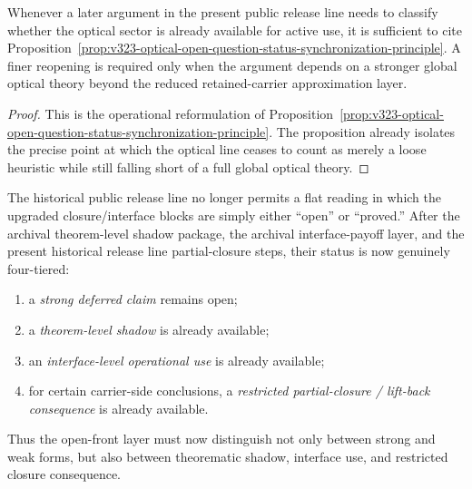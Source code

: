 \begin{corollary}
\label{cor:use-rule-for-the-synchronized-v323-optical-status-reading}
Whenever a later argument in the present public  release line needs to classify whether the optical sector is already available for active use, it is sufficient to cite Proposition~\ref{prop:v323-optical-open-question-status-synchronization-principle}. A finer reopening is required only when the argument depends on a stronger global optical theory beyond the reduced retained-carrier approximation layer.
\end{corollary}

\begin{proof}
This is the operational reformulation of Proposition~\ref{prop:v323-optical-open-question-status-synchronization-principle}. The proposition already isolates the precise point at which the optical line ceases to count as merely a loose heuristic while still falling short of a full global optical theory.
\end{proof}


\begin{remark}
\label{rem:v322-synchronized-status-reading-upgraded-closure-layer}
The historical public  release line no longer permits a flat reading in which the upgraded closure/interface blocks are simply either ``open'' or ``proved.'' After the archival theorem-level shadow package, the archival interface-payoff layer, and the present historical release line partial-closure steps, their status is now genuinely four-tiered:
\begin{enumerate}[leftmargin=2em,label=(\roman*)]
 \item a \emph{strong deferred claim} remains open;
 \item a \emph{theorem-level shadow} is already available;
 \item an \emph{interface-level operational use} is already available;
 \item for certain carrier-side conclusions, a \emph{restricted partial-closure / lift-back consequence} is already available.
\end{enumerate}
Thus the open-front layer must now distinguish not only between strong and weak forms, but also between theorematic shadow, interface use, and restricted closure consequence.
\end{remark}

